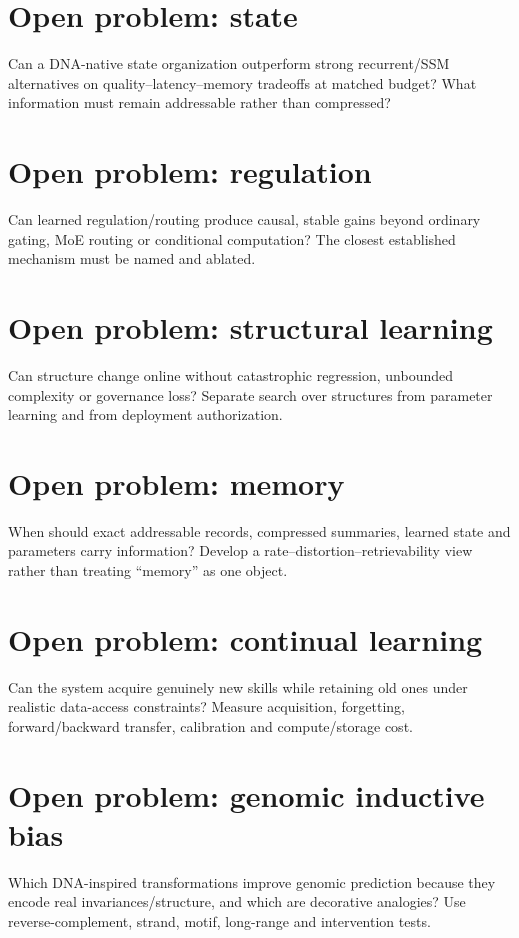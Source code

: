\section{Open problem: state}
Can a DNA-native state organization outperform strong recurrent/SSM alternatives on quality--latency--memory tradeoffs at matched budget? What information must remain addressable rather than compressed?

\section{Open problem: regulation}
Can learned regulation/routing produce causal, stable gains beyond ordinary gating, MoE routing or conditional computation? The closest established mechanism must be named and ablated.

\section{Open problem: structural learning}
Can structure change online without catastrophic regression, unbounded complexity or governance loss? Separate search over structures from parameter learning and from deployment authorization.

\section{Open problem: memory}
When should exact addressable records, compressed summaries, learned state and parameters carry information? Develop a rate--distortion--retrievability view rather than treating ``memory'' as one object.

\section{Open problem: continual learning}
Can the system acquire genuinely new skills while retaining old ones under realistic data-access constraints? Measure acquisition, forgetting, forward/backward transfer, calibration and compute/storage cost.

\section{Open problem: genomic inductive bias}
Which DNA-inspired transformations improve genomic prediction because they encode real invariances/structure, and which are decorative analogies? Use reverse-complement, strand, motif, long-range and intervention tests.

